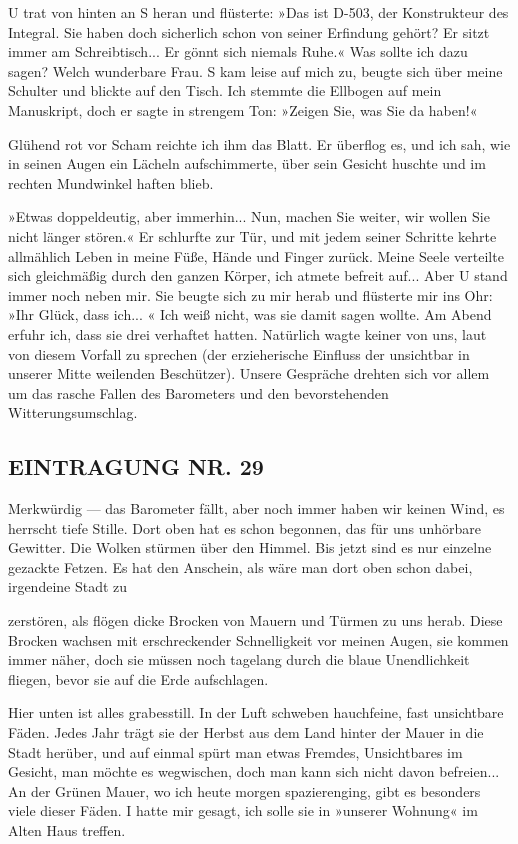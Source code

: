 U trat von hinten an S heran und flüsterte: »Das ist D-503, der
Konstrukteur des Integral. Sie haben doch sicherlich schon von
seiner Erfindung gehört? Er sitzt immer am Schreibtisch... Er gönnt
sich niemals Ruhe.« Was sollte ich dazu sagen? Welch wunderbare
Frau. S kam leise auf mich zu, beugte sich über meine Schulter und
blickte auf den Tisch. Ich stemmte die Ellbogen auf mein
Manuskript, doch er sagte in strengem Ton: »Zeigen Sie, was Sie da
haben!«

Glühend rot vor Scham reichte ich ihm das Blatt. Er überflog es,
und ich sah, wie in seinen Augen ein Lächeln aufschimmerte, über
sein Gesicht huschte und im rechten Mundwinkel haften blieb.

»Etwas doppeldeutig, aber immerhin... Nun, machen Sie weiter, wir
wollen Sie nicht länger stören.« Er schlurfte zur Tür, und mit
jedem seiner Schritte kehrte allmählich Leben in meine Füße, Hände
und Finger zurück. Meine Seele verteilte sich gleichmäßig durch den
ganzen Körper, ich atmete befreit auf... Aber U stand immer noch
neben mir. Sie beugte sich zu mir herab und flüsterte mir ins Ohr:
»Ihr Glück, dass ich... « Ich weiß nicht, was sie damit sagen
wollte. Am Abend erfuhr ich, dass sie drei verhaftet hatten.
Natürlich wagte keiner von uns, laut von diesem Vorfall zu sprechen
(der erzieherische Einfluss der unsichtbar in unserer Mitte
weilenden Beschützer). Unsere Gespräche drehten sich vor allem um
das rasche Fallen des Barometers und den bevorstehenden
Witterungsumschlag.

\subsection{EINTRAGUNG NR. 29}

Merkwürdig — das Barometer fällt, aber noch immer haben wir keinen
Wind, es herrscht tiefe Stille. Dort oben hat es schon begonnen,
das für uns unhörbare Gewitter. Die Wolken stürmen über den Himmel.
Bis jetzt sind es nur einzelne gezackte Fetzen. Es hat den
Anschein, als wäre man dort oben schon dabei, irgendeine Stadt zu

zerstören, als flögen dicke Brocken von Mauern und Türmen zu uns
herab. Diese Brocken wachsen mit erschreckender Schnelligkeit vor
meinen Augen, sie kommen immer näher, doch sie müssen noch tagelang
durch die blaue Unendlichkeit fliegen, bevor sie auf die Erde
aufschlagen.

Hier unten ist alles grabesstill. In der Luft schweben hauchfeine,
fast unsichtbare Fäden. Jedes Jahr trägt sie der Herbst aus dem
Land hinter der Mauer in die Stadt herüber, und auf einmal spürt
man etwas Fremdes, Unsichtbares im Gesicht, man möchte es
wegwischen, doch man kann sich nicht davon befreien... An der
Grünen Mauer, wo ich heute morgen spazierenging, gibt es besonders
viele dieser Fäden. I hatte mir gesagt, ich solle sie in »unserer
Wohnung« im Alten Haus treffen.


